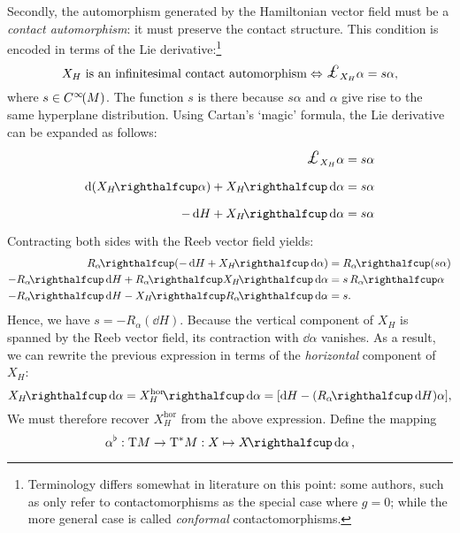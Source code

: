 Secondly, the automorphism generated by the Hamiltonian vector field must be a \emph{contact automorphism}: it must preserve the contact structure. This condition is encoded in terms of the Lie derivative:\footnote
{Terminology differs somewhat in literature on this point: some authors, such as \citet{DeLeon2020} only refer to contactomorphisms as the special case where $g = 0$; while the more general case is called \emph{conformal} contactomorphisms.}
$$ X_H \text{ is an infinitesimal contact automorphism} \Leftrightarrow \lied{X_H}{\alpha} = s\alpha, $$
where $s \in C^\infty\!\qty(M)$. The function $s$ is there because $s \alpha $ and $\alpha$ give rise to the same hyperplane distribution. 
Using Cartan's `magic' formula, the Lie derivative can be expanded as follows:
\begin{equation*}
    \begin{split}
        \lied{X_H}{\alpha} &= s \alpha\\
        \dd{\qty(\intpr{X_H}{\alpha})} + \intpr{X_H}{\dd{\alpha}} &= s\alpha \\
        -\dd{H} + \intpr{X_H}{\dd{\alpha}} &= s\alpha \\
    \end{split}
\end{equation*}
Contracting both sides with the Reeb vector field yields:
\begin{equation*}
    \begin{split}
        \intpr{R_\alpha}{\qty(-\dd{H} + \intpr{X_H}{\dd{\alpha}})} &= \intpr{R_\alpha}{\qty(s\alpha)} \\
        -\intpr{R_\alpha}{\dd{H}} + \intpr{R_\alpha}{\intpr{X_H}{\dd{\alpha}}} &= s\,\intpr{R_\alpha}{\alpha} \\
        -\intpr{R_\alpha}{\dd{H}} - \intpr{X_H}{\intpr{R_\alpha}{\dd{\alpha}}} &= s.
    \end{split}
\end{equation*}
Hence, we have $s = -R_\alpha(\dd{H})$. Because the vertical component of $X_H$ is spanned by the Reeb vector field, its contraction with $\dd{\alpha}$ vanishes. As a result, we can rewrite the previous expression in terms of the \emph{horizontal} component of $X_H$:
\begin{equation}
    \intpr{X_H}{\dd{\alpha}} = \intpr{X_H^\text{hor}}{\dd{\alpha}}=  \qty[\dd{H} - \qty(\intpr{R_\alpha}{\dd{H}})\alpha], 
    \label{eq:basic_form}
\end{equation}
We must therefore recover $X^\text{hor}_H$ from the above expression. Define the mapping  
$$ \toDual{\alpha}: \tbundle{M} \to \ctbundle{M}: X \mapsto  \intpr{X}{\dd{\alpha}},$$
